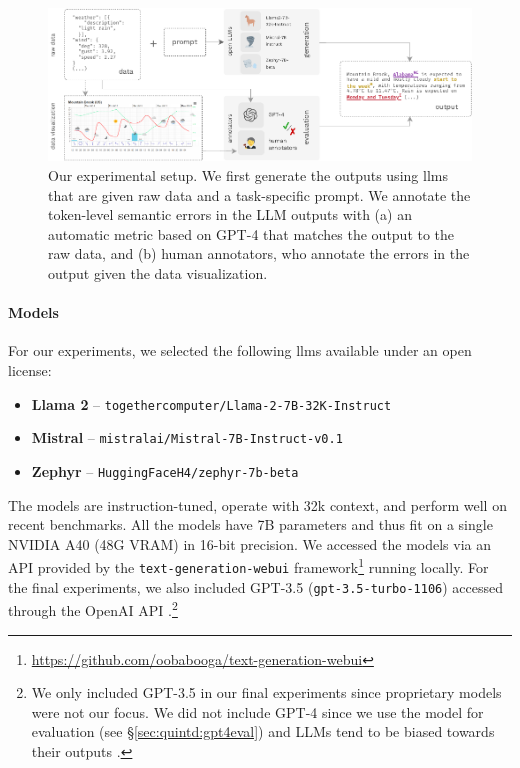 \begin{figure}[t]
    \centering
    \includegraphics[width=\textwidth]{img/quintd_process.pdf}
    \caption[Our experimental setup for data-to-text with large language models.]{Our experimental setup. We first generate the outputs using \acp{llm} that are given raw data and a task-specific prompt. We annotate the token-level semantic errors in the LLM outputs with (a) an automatic metric based on GPT-4 that matches the output to the raw data, and (b) human annotators, who annotate the errors in the output given the data visualization.}\label{fig:quintd:process}
\end{figure}

\paragraph{Models}
\label{sec:quintd:models}
For our experiments, we selected the following \acp{llm} available under an open license:

\begin{itemize}
    \item \textbf{Llama 2} \cite{touvronLlamaOpenFoundation2023,llama-2-7b-32k} -- \texttt{\small together\-computer\-/Llama-2-7B\--32K-Instruct}
    \item \textbf{Mistral} \cite{jiangMistral7B2023} -- \texttt{\small mistralai/Mistral-7B-Instruct-v0.1}
    \item \textbf{Zephyr}  \cite{tunstallZephyrDirectDistillation2023} -- \texttt{\small HuggingFaceH4/zephyr-7b-beta}
\end{itemize}

The models are instruction-tuned, operate with 32k context, and perform well on recent benchmarks. All the models have 7B parameters and thus fit on a single NVIDIA A40 (48G VRAM) in 16-bit precision. We accessed the models via an API provided by the \texttt{text-generation-webui} framework\footnote{\url{https://github.com/oobabooga/text-generation-webui}} running locally.
For the final experiments, we also included GPT-3.5 (\texttt{gpt-3.5-turbo-1106}) accessed through the OpenAI API \cite{chatgpt}.\footnote{We only included GPT-3.5 in our final experiments since proprietary models were not our focus. We did not include GPT-4 since we use the model for evaluation (see §\ref{sec:quintd:gpt4eval}) and LLMs tend to be biased towards their outputs \cite{kooBenchmarkingCognitiveBiases2023,stureborgLargeLanguageModels2024}.}

